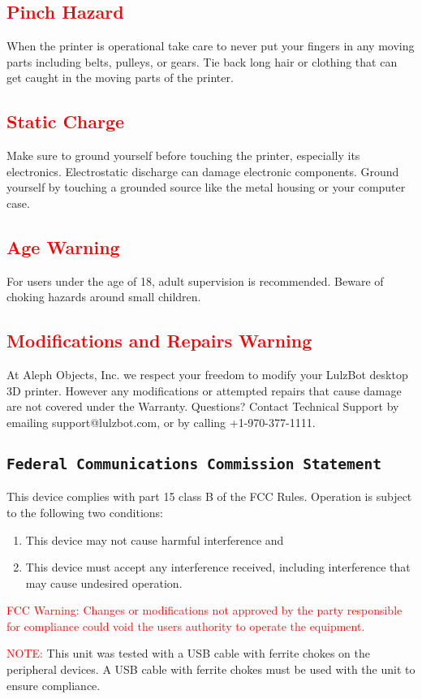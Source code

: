 \subsection{\textcolor{red}{Pinch Hazard}}

When the printer is operational take care to never put your fingers in any moving parts including belts, pulleys, or gears. Tie back long hair or clothing that can get caught in the moving parts of the printer.

\subsection{\textcolor{red}{Static Charge}}
Make sure to ground yourself before touching the printer, especially its electronics. Electrostatic discharge can damage electronic components. Ground yourself by touching a grounded source like the metal housing or your computer case.

\subsection{\textcolor{red}{Age Warning}}

For users under the age of 18, adult supervision is recommended. Beware of choking hazards around small children.

\subsection{\textcolor{red}{Modifications and Repairs Warning}}

At Aleph Objects, Inc.\textsuperscript{\miniscule{\textregistered}} we respect your freedom to modify your LulzBot desktop 3D printer. However any modifications or attempted repairs that cause damage are not covered under the Warranty. Questions? Contact Technical Support by emailing support@lulzbot.com, or by calling +1-970-377-1111.

\subsection{\texttt{Federal Communications Commission Statement}}
This device complies with part 15 class B of the FCC Rules. Operation is subject to the following two conditions:
\begin{enumerate}
\item This device may not cause harmful interference and
\item This device must accept any interference received, including interference that may cause undesired operation.
\end{enumerate}

\textcolor{red}{FCC Warning:}
\textcolor{red}{Changes or modifications not approved by the party responsible for compliance could void the users authority to operate the equipment.}

\textcolor{red}{NOTE:} This unit was tested with a USB cable with ferrite chokes on the peripheral devices. A USB cable with ferrite chokes must be used with the unit to ensure compliance.



